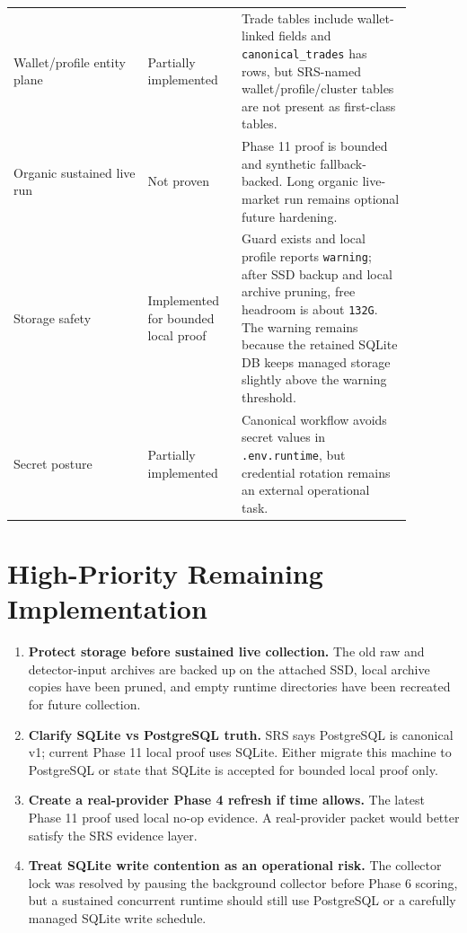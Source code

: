 \documentclass{article}
\begin{document}
\begin{longtable}{p{0.30\linewidth}p{0.20\linewidth}p{0.38\linewidth}}
Wallet/profile entity plane & Partially implemented & Trade tables include wallet-linked fields and \texttt{canonical\_trades} has rows, but SRS-named wallet/profile/cluster tables are not present as first-class tables. \\
Organic sustained live run & Not proven & Phase 11 proof is bounded and synthetic fallback-backed. Long organic live-market run remains optional future hardening. \\
Storage safety & Implemented for bounded local proof & Guard exists and local profile reports \texttt{warning}; after SSD backup and local archive pruning, free headroom is about \texttt{132G}. The warning remains because the retained SQLite DB keeps managed storage slightly above the warning threshold. \\
Secret posture & Partially implemented & Canonical workflow avoids secret values in \texttt{.env.runtime}, but credential rotation remains an external operational task. \\
\end{longtable}

\section*{High-Priority Remaining Implementation}
\begin{enumerate}
\item \textbf{Protect storage before sustained live collection.} The old raw and detector-input archives are backed up on the attached SSD, local archive copies have been pruned, and empty runtime directories have been recreated for future collection.
\item \textbf{Clarify SQLite vs PostgreSQL truth.} SRS says PostgreSQL is canonical v1; current Phase 11 local proof uses SQLite. Either migrate this machine to PostgreSQL or state that SQLite is accepted for bounded local proof only.
\item \textbf{Create a real-provider Phase 4 refresh if time allows.} The latest Phase 11 proof used local no-op evidence. A real-provider packet would better satisfy the SRS evidence layer.
\item \textbf{Treat SQLite write contention as an operational risk.} The collector lock was resolved by pausing the background collector before Phase 6 scoring, but a sustained concurrent runtime should still use PostgreSQL or a carefully managed SQLite write schedule.
\end{enumerate}
\end{document}
